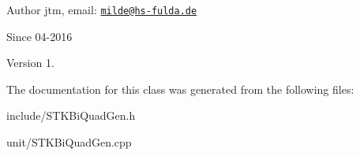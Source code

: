 \begin{DoxyAuthor}{Author}
jtm, email\-:  \href{mailto:milde@hs-fulda.de}{\tt milde@hs-\/fulda.\-de} 
\end{DoxyAuthor}
\begin{DoxySince}{Since}
04-\/2016 
\end{DoxySince}
\begin{DoxyVersion}{Version}
1. 
\end{DoxyVersion}


The documentation for this class was generated from the following files\-:\begin{DoxyCompactItemize}
\item 
include/S\-T\-K\-Bi\-Quad\-Gen.\-h\item 
unit/S\-T\-K\-Bi\-Quad\-Gen.\-cpp\end{DoxyCompactItemize}
